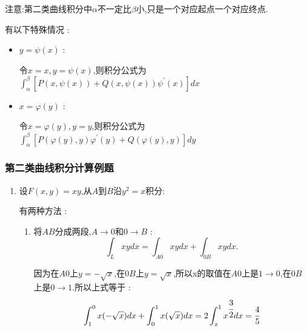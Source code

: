 \documentclass[UTF8,12pt]{ctexbook}
\newcommand{\derivative}{^\prime}
\newcommand{\definiteIntegral}[2]{\int^{#1}_{#2}}
\newcommand{\pathIntegral}[1]{\int_{#1}}
\newcommand{\tikzPlaceDot}[1]{\draw[fill = black] #1 circle (1pt)}
\begin{document}
{{{{      注意:第二类曲线积分中$\alpha$不一定比$\beta$小,只是一个对应起点一个对应终点.

      有以下特殊情况 :
      \begin{itemize}
        \item {
              $y = \psi(x)$ :

              令$x = x,y = \psi(x)$,则积分公式为$\definiteIntegral{\beta}{\alpha}[P(x,\psi(x)) + Q(x,\psi(x))\psi\derivative(x)]dx$
              }
        \item{
              $x = \varphi(y)$ :

              令$x = \varphi(y),y = y$,则积分公式为$\definiteIntegral{\beta}{\alpha}[P(\varphi(y),y)\varphi\derivative(y) + Q(\varphi(y),y)]dy$
              }
      \end{itemize}
    }%

    \subsubsection{第二类曲线积分计算例题}{
      \begin{enumerate}
        \item {
              设$F(x,y) = xy$,从$A$到$B$沿$y^2 = x$积分:


              有两种方法 :
              \begin{enumerate}
                \item {
                      将$AB$分成两段,$A \to 0$和$0 \to B$ :
                      $$
                        \pathIntegral{L}xydx = \pathIntegral{A0}xydx + \pathIntegral{0B}xydx.
                      $$

                      因为在$A0$上$y = -\sqrt{x}$,在$0B$上$y = \sqrt{x}$,所以x的取值在$A0$上是$1 \to 0$,在$0B$上是$0 \to 1$.所以上式等于 :
                      $$
                        \definiteIntegral{0}{1}x(-\sqrt{x})dx + \definiteIntegral{1}{0}x(\sqrt{x})dx = 2\definiteIntegral{1}{x}x^{\cfrac{3}{2}}dx = \cfrac{4}{5}
                      $$

}
\end{enumerate}}
\end{enumerate}}}}}
\end{document}

